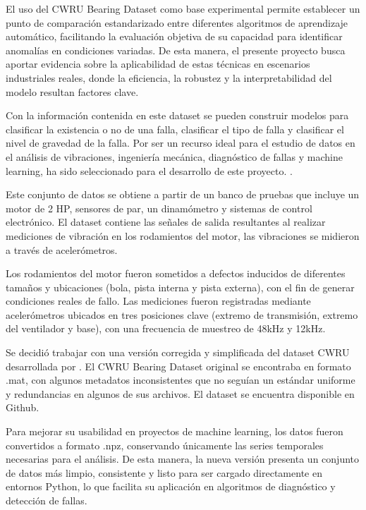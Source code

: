 \documentclass[11pt,a4paper,spanish]{book}
\numberwithin{equation}{chapter}
\numberwithin{figure}{chapter}
\begin{document}
El uso del CWRU Bearing Dataset como base experimental permite establecer un punto 
de comparación estandarizado entre diferentes algoritmos de aprendizaje automático, 
facilitando la evaluación objetiva de su capacidad para identificar anomalías en 
condiciones variadas. 
De esta manera, el presente proyecto busca aportar evidencia sobre la aplicabilidad 
de estas técnicas en escenarios industriales reales, donde la eficiencia, la robustez y 
la interpretabilidad del modelo resultan factores clave.


Con la información contenida en este dataset se pueden construir modelos para 
clasificar la existencia o no de una falla, clasificar el tipo de falla y clasificar 
el nivel de gravedad de la falla. Por ser un recurso ideal para el estudio de datos en 
el análisis de vibraciones, ingeniería mecánica, diagnóstico de fallas y machine 
learning, ha sido seleccionado para el desarrollo de este proyecto. 
\cite{caseWesternBearingData}. 


Este conjunto de datos se obtiene a partir de un banco de pruebas que incluye un motor 
de 2 HP, sensores de par, un dinamómetro y sistemas de control electrónico. 
El dataset contiene las señales de salida resultantes al realizar mediciones de 
vibración en los rodamientos del motor, las vibraciones se midieron a través de 
acelerómetros.  


Los rodamientos del motor fueron sometidos a defectos inducidos de diferentes tamaños 
y ubicaciones (bola, pista interna y pista externa), con el fin de generar condiciones 
reales de fallo. Las mediciones fueron registradas mediante acelerómetros ubicados en 
tres posiciones clave (extremo de transmisión, extremo del ventilador y base), con una 
frecuencia de muestreo de 48kHz y 12kHz. 


Se decidió trabajar con una versión corregida y simplificada del dataset CWRU 
desarrollada por \cite{rigas2024marine}. El CWRU Bearing Dataset original se encontraba 
en formato .mat, con algunos metadatos inconsistentes que no seguían un estándar 
uniforme y redundancias en algunos de sus archivos. El dataset se encuentra disponible 
en Github. 


Para mejorar su usabilidad en proyectos de machine learning, los datos fueron 
convertidos a formato .npz, conservando únicamente las series temporales necesarias 
para el análisis. De esta manera, la nueva versión presenta un conjunto de datos más 
limpio, consistente y listo para ser cargado directamente en entornos Python, lo que 
facilita su aplicación en algoritmos de diagnóstico y detección de fallas.
\end{document}
